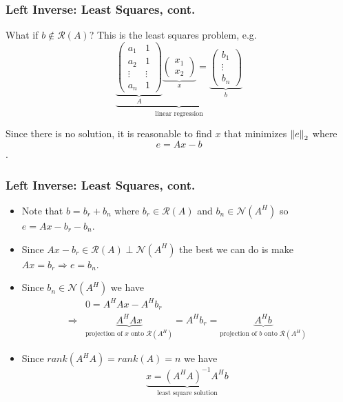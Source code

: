 \documentclass{beamer}
\begin{document}
\begin{frame}\frametitle{Left Inverse: Least Squares, cont.}
	What if $b \notin \mathcal{R}(A)$?  This is the least squares problem, e.g.
	\[
	\underbrace{
		\underbrace{
		\begin{pmatrix}
 	   		a_1 & 1\\
  	  		a_2 & 1\\
  	  		\vdots & \vdots \\
   	 		a_n & 1
 	 	\end{pmatrix}
		}_A
		\underbrace{
		\begin{pmatrix}
	  		x_1\\
	  		x_2
		\end{pmatrix}
		}_x
		= \underbrace{
		\begin{pmatrix}
  	  		b_1\\
  	  		\vdots\\
  	  		b_n
  		\end{pmatrix}
  		}_b
		}_{\text{ linear regression }}
	\]

	Since there is no solution, it is reasonable to find $x$ that minimizes $\left\|e\right\|_2$ where
	\[ e = Ax - b \].

\end{frame}

\begin{frame}\frametitle{Left Inverse: Least Squares, cont.}
	\begin{itemize}
	\item 	Note that $b = b_r + b_n$ where $b_r \in \mathcal{R}(A)$ and $b_n \in \mathcal{N}(A^H)$ so $e = Ax - b_r - b_n.$
	\item Since $Ax - b_r \in \mathcal{R}(A) \perp \mathcal{N}(A^H)$ the best we can do is make $Ax = b_r \Rightarrow e = b_n$.
	\item Since $b_n \in \mathcal{N}(A^H) $ we have 
		\begin{align*}
			& 0 = A^HAx - A^Hb_r \\
			\Rightarrow & \underbrace{A^HAx}_{\text{projection of $x$ onto $\mathcal{R}(A^H)$}} = A^Hb_r = \underbrace{A^Hb}_{\text{projection of $b$ onto $\mathcal{R}(A^H)$}}
		\end{align*}
	\item Since $rank(A^HA) = rank(A) = n$ we have
		\[\underbrace{x = (A^HA)^{-1}A^Hb}_{\text{least square solution}}\]
	\end{itemize}
\end{frame}
\end{document}
